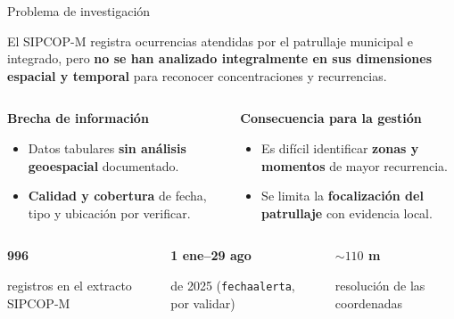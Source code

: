\documentclass[aspectratio=169,10pt]{beamer}
\newcommand{\minstat}[2]{\begin{tcolorbox}[tarjetaestilo,height=1.45cm,valign=center,halign=center,left=3pt,right=3pt]
  {\fontsize{18}{20}\selectfont\bfseries\color{TesisVerde}#1}\par{\scriptsize\color{TesisTinta}#2}\end{tcolorbox}}
\begin{document}
\begin{frame}{Problema de investigación}
  \begin{tarjeta}[borderline west={4pt}{0pt}{TesisVerde},fontupper=\normalsize]
    El SIPCOP-M registra ocurrencias atendidas por el patrullaje municipal e integrado, pero \textbf{no se han analizado integralmente en sus dimensiones espacial y temporal} para reconocer concentraciones y recurrencias.
  \end{tarjeta}
  \vspace{.05cm}
  \begin{columns}[T,onlytextwidth]
      \begin{tarjeta}[height=2.3cm]
        {\bfseries\color{TesisVerde} Brecha de información}
        \begin{itemize}\footnotesize
          \item Datos tabulares \textbf{sin análisis geoespacial} documentado.
          \item \textbf{Calidad y cobertura} de fecha, tipo y ubicación por verificar.
        \end{itemize}
      \end{tarjeta}
      \begin{tarjeta}[height=2.3cm]
        {\bfseries\color{TesisVerde} Consecuencia para la gestión}
        \begin{itemize}\footnotesize
          \item Es difícil identificar \textbf{zonas y momentos} de mayor recurrencia.
          \item Se limita la \textbf{focalización del patrullaje} con evidencia local.
        \end{itemize}
      \end{tarjeta}
  \end{columns}
  \vspace{.05cm}
  \begin{columns}[T,onlytextwidth]
    \minstat{996}{registros en el extracto SIPCOP-M}
    \minstat{1 ene--29 ago}{de 2025 (\texttt{fechaalerta}, por validar)}
    \minstat{${\sim}110$ m}{resolución de las coordenadas}
  \end{columns}
  \end{frame}
\end{document}
